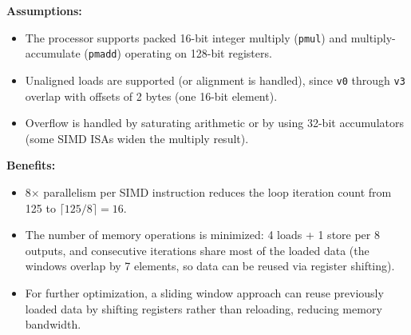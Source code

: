 \medskip\noindent\textbf{Assumptions:}
\begin{itemize}
  \item The processor supports packed 16-bit integer multiply (\texttt{pmul})
        and multiply-accumulate (\texttt{pmadd}) operating on 128-bit registers.
  \item Unaligned loads are supported (or alignment is handled), since \texttt{v0}
        through \texttt{v3} overlap with offsets of 2 bytes (one 16-bit element).
  \item Overflow is handled by saturating arithmetic or by using 32-bit
        accumulators (some SIMD ISAs widen the multiply result).
\end{itemize}

\medskip\noindent\textbf{Benefits:}
\begin{itemize}
  \item 8$\times$ parallelism per SIMD instruction reduces the loop iteration
        count from 125 to $\lceil 125/8 \rceil = 16$.
  \item The number of memory operations is minimized: 4 loads + 1 store per
        8 outputs, and consecutive iterations share most of the loaded data (the
        windows overlap by 7 elements, so data can be reused via register
        shifting).
  \item For further optimization, a sliding window approach can reuse previously
        loaded data by shifting registers rather than reloading, reducing memory
        bandwidth.
\end{itemize}

